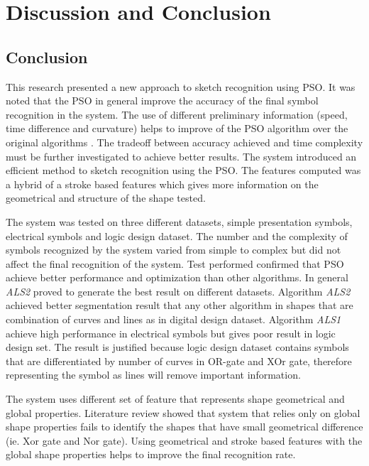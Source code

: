 \chapter{Discussion and Conclusion}
\label{sec:DiscussionConclusion}

\section{Conclusion}
\label{sec:ConclusionConclusion}

This research presented a new approach to sketch recognition using PSO. It was noted that the PSO in general improve the accuracy of the final symbol recognition in the system. The use of different preliminary information (speed, time difference and curvature)  helps to improve of the PSO algorithm over the original algorithms \cite{CruveDivisionSwarm,PolygonApproximationPSO}. The tradeoff between accuracy achieved and time complexity must be further investigated to achieve better results.  The system introduced an efficient method to sketch recognition using the PSO. The features computed was a hybrid of a stroke based features which gives more information on the geometrical and structure of the shape tested.  

The system was tested on three different datasets, simple presentation symbols, electrical symbols and logic design dataset. The number and the complexity of symbols recognized by the system varied from simple to complex but did not affect the final recognition of the system. Test performed confirmed that PSO achieve better performance and optimization than other algorithms. In general \textsl{ALS2} proved to generate the best result on different datasets. Algorithm \textsl{ALS2} achieved better segmentation result that any other algorithm in shapes that are combination of curves and lines as in digital design dataset. Algorithm \textsl{ALS1} achieve high performance in electrical symbols but gives poor result in logic design set. The result is justified because logic design dataset contains symbols that are differentiated by number of curves in OR-gate and XOr gate, therefore representing the symbol as lines will remove important information. 

The system uses different set of feature that represents shape geometrical and global properties. Literature review showed that system that relies only on global shape properties fails to identify the shapes that have small geometrical difference (ie. Xor gate and Nor gate). Using geometrical and stroke based features with the global shape properties helps to improve the final recognition rate.     



